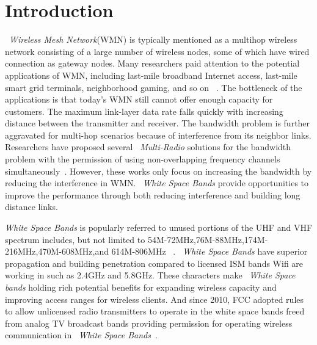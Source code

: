 \section{Introduction}
\label{sec:introduction}


~\emph{Wireless Mesh Network}(WMN) is typically mentioned as a multihop wireless network consisting of a large number of wireless nodes, some of which have wired connection as gateway nodes. Many researchers paid attention to the potential applications of WMN, including last-mile broadband Internet access, last-mile smart grid terminals, neighborhood gaming, and so on ~\cite{bahl2004opportunities}.
The bottleneck of the applications is that today's WMN still cannot offer enough capacity for customers. The maximum link-layer data rate falls quickly with increasing distance between the transmitter and receiver. The bandwidth problem is further aggravated for multi-hop scenarios because of interference from its neighbor links. Researchers have proposed several ~\emph{Multi-Radio} solutions for the bandwidth problem with the permission of using non-overlapping frequency channels simultaneously~\cite{raniwala2004centralized,tang2005interference,si2010overview}.
However, these works only focus on increasing the bandwidth by reducing the interference in WMN. ~\emph{White Space Bands} provide opportunities to improve the performance through both reducing interference and building long distance links. 

\emph{White Space Bands} is popularly referred to unused portions of the UHF and VHF spectrum includes, but not limited to 54M-72MHz,76M-88MHz,174M-216MHz,470M-608MHz,and 614M-806MHz ~\cite{whitespacewiki}. 
~\emph{White Space Bands} have superior propagation and building penetration compared to licensed ISM bands Wifi are working in such as 2.4GHz and 5.8GHz. These characters make ~\emph{White Space bands} holding rich potential benefits for expanding wireless capacity and improving access ranges for wireless clients.
And since 2010, FCC adopted rules to allow unlicensed radio transmitters to operate in the white space bands freed from analog TV broadcast bands providing permission for operating wireless communication in ~\emph{White Space Bands}~\cite{fccwhitespace}. 

